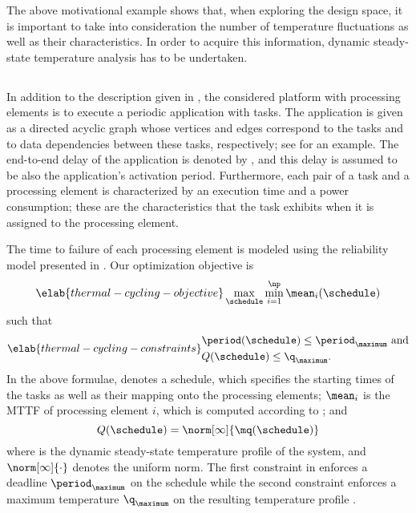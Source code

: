 The above motivational example shows that, when exploring the design space, it
is important to take into consideration the number of temperature fluctuations
as well as their characteristics. In order to acquire this information, dynamic
steady-state temperature analysis has to be undertaken.

\subsection{\problemtitle}

In addition to the description given in , the considered
platform with \np processing elements is to execute a periodic application with
\nt tasks. The application is given as a directed acyclic graph whose vertices
and edges correspond to the tasks and to data dependencies between these tasks,
respectively; see  for an example. The end-to-end
delay of the application is denoted by \period, and this delay is assumed to be
also the application's activation period. Furthermore, each pair of a task and a
processing element is characterized by an execution time and a power
consumption; these are the characteristics that the task exhibits when it is
assigned to the processing element.

The time to failure of each processing element is modeled using the reliability
model presented in . Our optimization objective is
\begin{equation} \elab{thermal-cycling-objective}
  \max_{\schedule} \min_{i = 1}^\np \mean_i(\schedule)
\end{equation}
such that
\begin{align} \elab{thermal-cycling-constraints}
  \begin{split}
    & \period(\schedule) \leq \period_\maximum \text{ and} \\
    & Q(\schedule) \leq \q_\maximum.
  \end{split}
\end{align}
In the above formulae, \schedule denotes a schedule, which specifies the
starting times of the tasks as well as their mapping onto the processing
elements; $\mean_i$ is the \ac{MTTF} of processing element $i$, which is
computed according to ; and
\[
  Q(\schedule) = \norm[\infty]{\mq(\schedule)}
\]
where \mq is the dynamic steady-state temperature profile of the system, and
$\norm[\infty]{\cdot}$ denotes the uniform norm. The first constraint in
 enforces a deadline $\period_\maximum$ on the
schedule while the second constraint enforces a maximum temperature
$\q_\maximum$ on the resulting temperature profile \mq.


